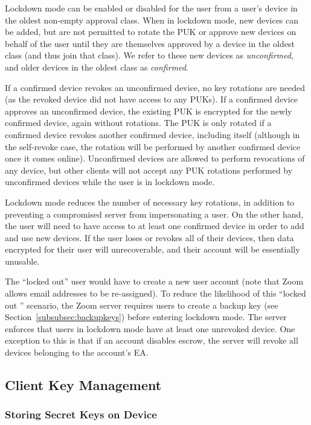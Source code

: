 Lockdown mode can be enabled or disabled for the user from a user's device in the oldest non-empty
approval class. When in lockdown mode, new devices can be added, but are not permitted to rotate the
PUK or approve new devices on behalf of the user until they are themselves approved by a device in
the oldest class (and thus join that class). We refer to these new devices as \textit{unconfirmed},
and older devices in the oldest class as \textit{confirmed}.

If a confirmed device revokes an unconfirmed device, no key rotations are needed (as the revoked
device did not have access to any PUKs). If a confirmed device approves an unconfirmed device, the
existing PUK is encrypted for the newly confirmed device, again without rotations. The PUK is only
rotated if a confirmed device revokes another confirmed device, including itself (although in the
self-revoke case, the rotation will be performed by another confirmed device once it comes online).
Unconfirmed devices are allowed to perform revocations of any device, but other clients will not
accept any PUK rotations performed by unconfirmed devices while the user is in lockdown mode.

Lockdown mode reduces the number of necessary key rotations, in addition to preventing a compromised
server from impersonating a user. On the other hand, the user will need to have access to at least
one confirmed device in order to add and use new devices. If the user loses or revokes all of their
devices, then data encrypted for their user will unrecoverable, and their account will be
essentially unusable.

The ``locked out'' user would have to create a new user account (note that Zoom allows email
addresses to be re-assigned). To reduce the likelihood of this ``locked out '' scenario, the Zoom
server requires users to create a backup key (see Section~\ref{subsubsec:backupkeys}) before
entering lockdown mode. The server enforces that users in lockdown mode have at least one unrevoked
device. One exception to this is that if an account disables escrow, the server will revoke all
devices belonging to the account's EA.



\subsection{Client Key Management}
\label{subsec:clientkeys}

\subsubsection{Storing Secret Keys on Device}
\label{subsec:lks}

